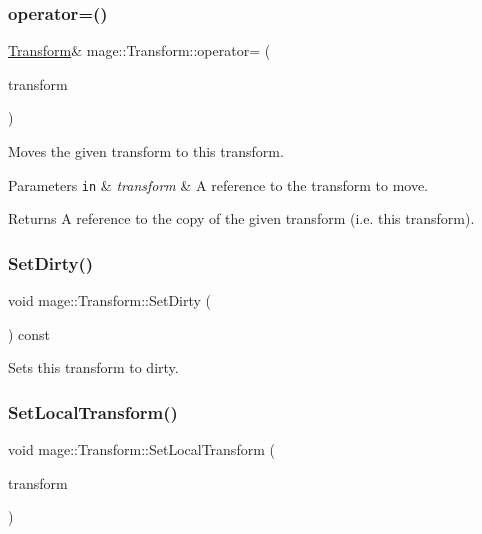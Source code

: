 \subsubsection{\texorpdfstring{operator=()}{operator=()}\hspace{0.1cm}{\footnotesize\ttfamily [2/2]}}
{\footnotesize\ttfamily \mbox{\hyperlink{classmage_1_1_transform}{Transform}}\& mage\+::\+Transform\+::operator= (\begin{DoxyParamCaption}\item[{\mbox{\hyperlink{classmage_1_1_transform}{Transform}} \&\&}]{transform }\end{DoxyParamCaption})\hspace{0.3cm}{\ttfamily [noexcept]}}

Moves the given transform to this transform.


\begin{DoxyParams}[1]{Parameters}
\mbox{\tt in}  & {\em transform} & A reference to the transform to move. \\
\hline
\end{DoxyParams}
\begin{DoxyReturn}{Returns}
A reference to the copy of the given transform (i.\+e. this transform). 
\end{DoxyReturn}
\mbox{\label{classmage_1_1_transform_a8d760d79f5ad68377706234b8575e429}} 
\subsubsection{\texorpdfstring{Set\+Dirty()}{SetDirty()}}
{\footnotesize\ttfamily void mage\+::\+Transform\+::\+Set\+Dirty (\begin{DoxyParamCaption}{ }\end{DoxyParamCaption}) const\hspace{0.3cm}{\ttfamily [noexcept]}}

Sets this transform to dirty. \mbox{\label{classmage_1_1_transform_aea61e643a669b5c8be12f5b70fee917d}} 
\subsubsection{\texorpdfstring{Set\+Local\+Transform()}{SetLocalTransform()}}
{\footnotesize\ttfamily void mage\+::\+Transform\+::\+Set\+Local\+Transform (\begin{DoxyParamCaption}\item[{\mbox{\hyperlink{classmage_1_1_s_e_t_transform3_d}{S\+E\+T\+Transform3D}}}]{transform }\end{DoxyParamCaption})\hspace{0.3cm}{\ttfamily [noexcept]}}


